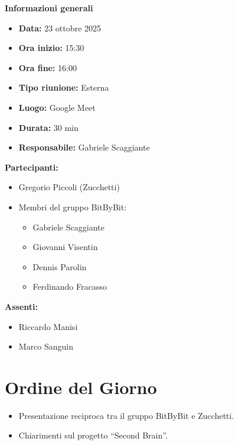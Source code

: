 \documentclass[a4paper,12pt]{article}
\begin{document}
{\large \textbf{Informazioni generali}}
{\footnotesize
{}
\begin{itemize}
    \item \textbf{Data:} 23 ottobre 2025
    \item \textbf{Ora inizio:} 15:30
    \item \textbf{Ora fine:} 16:00
    \item \textbf{Tipo riunione:} Esterna
    \item \textbf{Luogo:} Google Meet
    \item \textbf{Durata:} 30 min
    \item \textbf{Responsabile:} Gabriele Scaggiante
\end{itemize}

\vspace{0.2cm}

\textbf{Partecipanti:}
\begin{itemize}
    \item Gregorio Piccoli (Zucchetti)
    \item Membri del gruppo BitByBit:
    \begin{itemize}
        \item Gabriele Scaggiante
        \item Giovanni Visentin
        \item Dennis Parolin
        \item Ferdinando Fracasso
    \end{itemize}
\end{itemize}

\textbf{Assenti:}
\begin{itemize}
    \item Riccardo Manisi
    \item Marco Sanguin
\end{itemize}
}

\vspace{0.8cm}

\clearpage
\tableofcontents
\thispagestyle{empty}
\clearpage

\section{Ordine del Giorno}
\begin{itemize}
    \item Presentazione reciproca tra il gruppo BitByBit e Zucchetti.
    \item Chiarimenti sul progetto “Second Brain”.
\end{itemize}
\end{document}
